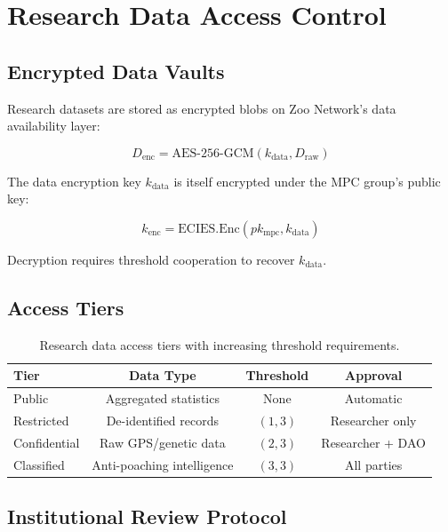 \section{Research Data Access Control}

\label{sec:data-access}

\subsection{Encrypted Data Vaults}

Research datasets are stored as encrypted blobs on Zoo Network's data availability layer:

\begin{equation}
D_{\text{enc}} = \text{AES-256-GCM}(k_{\text{data}}, D_{\text{raw}})
\end{equation}

The data encryption key $k_{\text{data}}$ is itself encrypted under the MPC group's public key:

\begin{equation}
k_{\text{enc}} = \text{ECIES.Enc}(pk_{\text{mpc}}, k_{\text{data}})
\end{equation}

Decryption requires threshold cooperation to recover $k_{\text{data}}$.

\subsection{Access Tiers}

\begin{table}[t]
\centering
\begin{tabular}{lccc}
\toprule
\textbf{Tier} & \textbf{Data Type} & \textbf{Threshold} & \textbf{Approval} \\
\midrule
Public & Aggregated statistics & None & Automatic \\
Restricted & De-identified records & $(1, 3)$ & Researcher only \\
Confidential & Raw GPS/genetic data & $(2, 3)$ & Researcher + DAO \\
Classified & Anti-poaching intelligence & $(3, 3)$ & All parties \\
\bottomrule
\end{tabular}
\caption{Research data access tiers with increasing threshold requirements.}
\label{tab:tiers}
\end{table}

\subsection{Institutional Review Protocol}

